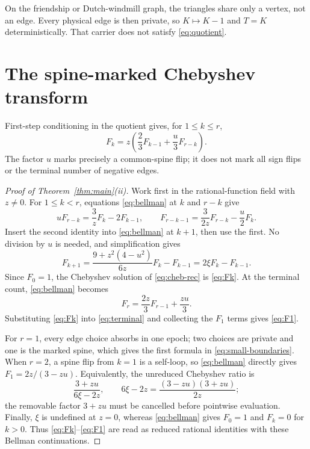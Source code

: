 \documentclass[a4paper,10pt]{amsart}
\theoremstyle{remark}
\begin{document}
On the friendship or Dutch-windmill graph, the triangles share only a vertex,
not an edge.  Every physical edge is then private, so $K\mapsto K-1$ and
$T=K$ deterministically.  That carrier does not satisfy
\eqref{eq:quotient}.

\section{The spine-marked Chebyshev transform}\label{sec:transform}

First-step conditioning in the quotient gives, for $1\leq k\leq r$,
\begin{equation}\label{eq:bellman}
 F_k=z\left(\frac23F_{k-1}+\frac{u}{3}F_{r-k}\right).
\end{equation}
The factor $u$ marks precisely a common-spine flip; it does not mark all sign
flips or the terminal number of negative edges.

\begin{proof}[Proof of Theorem~\ref{thm:main}(ii)]
Work first in the rational-function field with $z\neq0$.  For
$1\leq k<r$, equations \eqref{eq:bellman} at $k$ and $r-k$ give
\begin{equation}\label{eq:elim-pairs}
 uF_{r-k}=\frac{3}{z}F_k-2F_{k-1},\qquad
 F_{r-k-1}=\frac{3}{2z}F_{r-k}-\frac{u}{2}F_k.
\end{equation}
Insert the second identity into \eqref{eq:bellman} at $k+1$, then use the
first.  No division by $u$ is needed, and simplification gives
\begin{equation}\label{eq:cheb-rec}
 F_{k+1}=\frac{9+z^2(4-u^2)}{6z}F_k-F_{k-1}
        =2\xi F_k-F_{k-1}.
\end{equation}
Since $F_0=1$, the Chebyshev solution of \eqref{eq:cheb-rec} is
\eqref{eq:Fk}.  At the terminal count, \eqref{eq:bellman} becomes
\begin{equation}\label{eq:terminal}
 F_r=\frac{2z}{3}F_{r-1}+\frac{zu}{3}.
\end{equation}
Substituting \eqref{eq:Fk} into \eqref{eq:terminal} and collecting the
$F_1$ terms gives \eqref{eq:F1}.

For $r=1$, every edge choice absorbs in one epoch; two choices are private
and one is the marked spine, which gives the first formula in
\eqref{eq:small-boundaries}.  When $r=2$, a spine flip from $k=1$ is a
self-loop, so \eqref{eq:bellman} directly gives $F_1=2z/(3-zu)$.  Equivalently,
the unreduced Chebyshev ratio is
\[
 \frac{3+zu}{6\xi-2z},\qquad
 6\xi-2z=\frac{(3-zu)(3+zu)}{2z};
\]
the removable factor $3+zu$ must be cancelled before pointwise evaluation.
Finally, $\xi$ is undefined at $z=0$, whereas \eqref{eq:bellman} gives
$F_0=1$ and $F_k=0$ for $k>0$.  Thus \eqref{eq:Fk}--\eqref{eq:F1} are read as
reduced rational identities with these Bellman continuations.
\end{proof}
\end{document}
